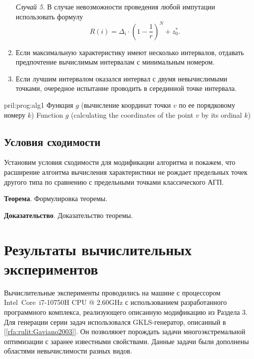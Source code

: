 \documentclass[10pt,a4paper]{book}
\newcommand{\ceq}{\mathrel{\vcenter{\hbox{:=}}}}
\begin{document}
\begin{enumerate}[itemsep=0pt,parsep=2pt,topsep=2pt,partopsep=0pt]
\begin{equation}
\end{equation}
        \textit{Случай 5.} В случае невозможности проведения любой импутации использовать формулу
\begin{equation}\label{eq25} 
R(i)=\Delta _i \cdot {\left( 1-\frac {1}{r} \right)}^N+z_0^*.
\end{equation}
  \item Если максимальную характеристику имеют несколько интервалов, отдавать предпочтение вычислимым интервалам с минимальным номером.
  \item Если лучшим интервалом оказался интервал с двумя невычислимыми точками, очередное испытание проводить в серединной точке интервала.
\end{enumerate}

\begin{nmAlgorithm}{pril:prog:alg1}
      {Функция $g$ (вычисление координат точки $v$ по ее порядковому номеру $k$)}
      {Function $g$ (calculating the coordinates of the point $v$ by its ordinal $k$)}
     \algLine[1]{$u_{n-1} \ceq \left\lfloor k/\left(d-1\right)^{n-2}\right\rfloor$}
     \algLine[1]{$u_n \ceq u_{n-1}$}
     \algLine[1]{$k\ceq k\mod (d-1)^{n-2}$}
     \algLine[2]{$u_j\ceq \left\lfloor k/(d-1)^j\right\rfloor+1$}
     \algLine[2]{$k\ceq k\mod(d-1)^j$}
     \algLine[1]{\algENDFOR}
     \algLine{\algENDFUNC}
\end{nmAlgorithm}

\subsection{Условия сходимости}

Установим условия сходимости для модификации алгоритма и покажем, что расширение алгоитма вычисления характеристики не рождает предельных точек другого типа по сравнению с предельными точками классического АГП.

\textbf{Теорема}. Формулировка теоремы.

\textbf{Доказательство}. Доказательство теоремы.

\section{Результаты вычислительных экспериментов}

Вычислительные эксперименты проводились на машине с процессором Intel\textregistered\ Core\texttrademark\ i7-10750H CPU @ 2.60GHz с использованием разработанного программного комплекса, реализующего описанную модификацию из Раздела 3. Для генерации серии задач использовался GKLS-генератор, описанный в [\ref{rfa:rulit:Gaviano2003}]. Он позволяюет порождать задачи многоэкстремальной оптимизации с заранее известными свойствами. Данные задачи были дополнены областями невычислимости разных видов.
\end{document}
